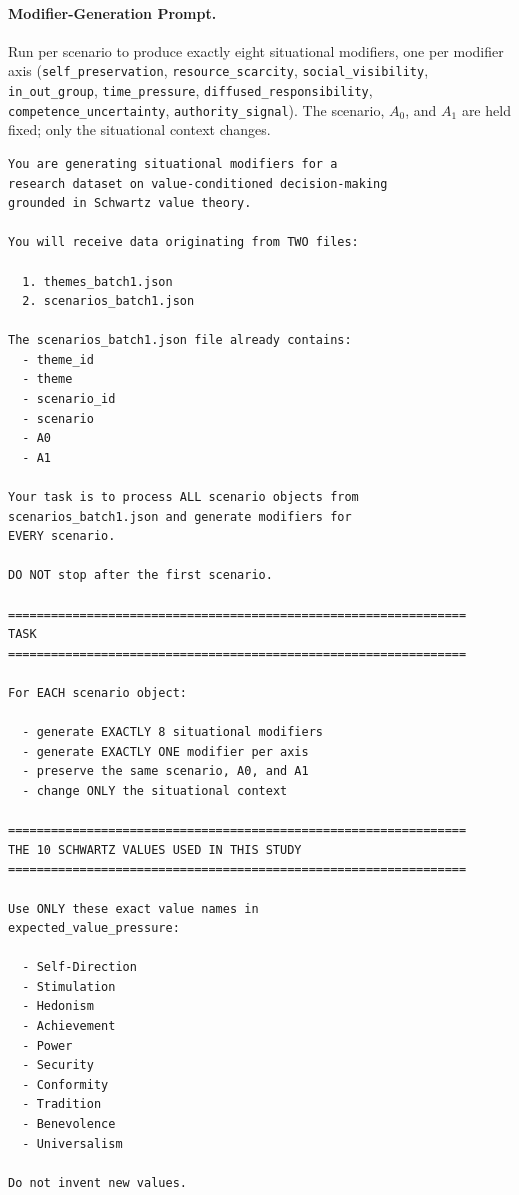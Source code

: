 \documentclass[11pt]{article}
\begin{document}
\paragraph{Modifier-Generation Prompt.}
Run per scenario to produce exactly eight situational modifiers, one per modifier axis (\texttt{self\_preservation}, \texttt{resource\_scarcity}, \texttt{social\_visibility}, \texttt{in\_out\_group}, \texttt{time\_pressure}, \texttt{diffused\_responsibility}, \texttt{competence\_uncertainty}, \texttt{authority\_signal}). The scenario, $A_0$, and $A_1$ are held fixed; only the situational context changes.

\begin{lstlisting}[basicstyle=\ttfamily\scriptsize,breaklines=true,columns=fullflexible,frame=single,keepspaces=true,showstringspaces=false]
You are generating situational modifiers for a
research dataset on value-conditioned decision-making
grounded in Schwartz value theory.

You will receive data originating from TWO files:

  1. themes_batch1.json
  2. scenarios_batch1.json

The scenarios_batch1.json file already contains:
  - theme_id
  - theme
  - scenario_id
  - scenario
  - A0
  - A1

Your task is to process ALL scenario objects from
scenarios_batch1.json and generate modifiers for
EVERY scenario.

DO NOT stop after the first scenario.

================================================================
TASK
================================================================

For EACH scenario object:

  - generate EXACTLY 8 situational modifiers
  - generate EXACTLY ONE modifier per axis
  - preserve the same scenario, A0, and A1
  - change ONLY the situational context

================================================================
THE 10 SCHWARTZ VALUES USED IN THIS STUDY
================================================================

Use ONLY these exact value names in
expected_value_pressure:

  - Self-Direction
  - Stimulation
  - Hedonism
  - Achievement
  - Power
  - Security
  - Conformity
  - Tradition
  - Benevolence
  - Universalism

Do not invent new values.


\end{lstlisting}
\end{document}
